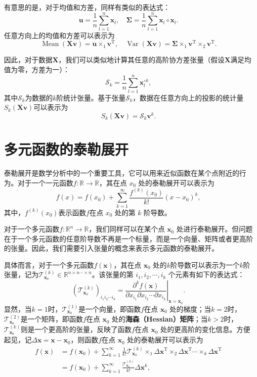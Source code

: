 有意思的是，对于均值和方差，同样有类似的表达式：
\[
    \bm{u} = \frac{1}{n} \sum_{l=1}^n \bm{x}_l, \quad \mathbf{\Sigma} = \frac{1}{n} \sum_{l=1}^n \bm{x}_l \circ \bm{x}_l.
\]
任意方向上的均值和方差可以表示为
\[
    \operatorname{Mean}(\mathbf{X} \bm{v}) = \bm{u} \times_1 \bm{v}^{\mathrm{T}}, \quad \operatorname{Var}(\mathbf{X} \bm{v}) = \mathbf{\Sigma} \times_1 \bm{v}^{\mathrm{T}} \times_2 \bm{v}^{\mathrm{T}}.
\]

因此，对于数据\( \mathbf{X} \)，我们可以类似地计算其任意的高阶协方差张量（假设\( \mathbf{X} \)满足均值为零，方差为一）：
\[
    \mathcal{S}_k = \frac{1}{n} \sum_{l=1}^n \bm{x}_l^{\circ k},
\]
其中\( \mathcal{S}_k \)为数据的\( k \)阶统计张量。基于张量\( \mathcal{S}_k \)，数据在任意方向上的投影的统计量\( S_k(\mathbf{X} \bm{v}) \)可以表示为
\[
    S_k(\mathbf{X} \bm{v}) = \mathcal{S}_k \bm{v}^k.
\]

\section{多元函数的泰勒展开}

泰勒展开是数学分析中的一个重要工具，它可以用来近似函数在某个点附近的行为。对于一个一元函数\( f: \mathbb{R} \to \mathbb{R} \)，其在点 \( x_0 \) 处的泰勒展开可以表示为
\[
    f(x) = f(x_0) + \sum_{k=1}^{\infty} \frac{f^{(k)}(x_0)}{k!} (x - x_0)^k,
\]
其中，\( f^{(k)}(x_0) \)表示函数\( f \)在点 \( x_0 \) 处的第 \( k \) 阶导数。

对于一个多元函数\( f: \mathbb{R}^n \to \mathbb{R} \)，我们同样可以在某个点 \( \bm{x}_0 \) 处进行泰勒展开。但问题在于一个多元函数的任意阶导数不再是一个标量，而是一个向量、矩阵或者更高阶的张量。因此，我们需要引入张量的概念来表示多元函数的泰勒展开。

具体而言，对于一个多元函数\( f(\bm{x}) \)，其在点 \( \bm{x}_0 \) 处的\( k \)阶导数可以表示为一个\( k \)阶张量，记为\(  \mathcal{T}^{(k)}_{\bm{x}_0}\in  \mathbb{R}^{n \times n \cdots \times n} \)。该张量的第 \( i_1, i_2, \cdots, i_k \) 个元素有如下的表达式：
\[
    \left(\mathcal{T}^{(k)}_{\bm{x}_0}\right)_{i_1 i_2 \cdots i_k} = \left.\frac{\partial^k f(\bm{x})}{\partial x_{i_1} \partial x_{i_2} \cdots \partial x_{i_k}}\right|_{\bm{x} = \bm{x}_0}.
\]
显然，当\( k = 1 \)时，\( \mathcal{T}^{(1)}_{\bm{x}_0} \)是一个向量，即函数\( f \)在点 \( \bm{x}_0 \) 处的梯度；当\( k = 2 \)时，\( \mathcal{T}^{(2)}_{\bm{x}_0} \)是一个矩阵，即函数\( f \)在点 \( \bm{x}_0 \) 处的\textbf{海森（Hessian）矩阵}；当\( k > 2 \)时，\( \mathcal{T}^{(k)}_{\bm{x}_0} \)则是一个更高阶的张量，反映了函数\( f \)在点 \( \bm{x}_0 \) 处的更高阶的变化信息。方便起见，记\( \Delta \bm{x} = \bm{x} - \bm{x}_0 \)，则函数\( f \)在点 \( \bm{x}_0 \) 处的泰勒展开可以表示为
\[
    \begin{split}
        f(\bm{x}) & = f(\bm{x}_0) + \sum_{k=1}^{\infty} \frac{1}{k!} \mathcal{T}^{(k)}_{\bm{x}_0} \times_1 \Delta \bm{x}^{\mathrm{T}} \times_2 \Delta \bm{x}^{\mathrm{T}} \cdots \times_k \Delta \bm{x}^{\mathrm{T}} \\
                  & = f(\bm{x}_0) + \sum_{k=1}^{\infty} \frac{\mathcal{T}^{(k)}_{\bm{x}_0}}{k!} \Delta \bm{x}^k,
    \end{split}
\]

